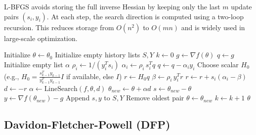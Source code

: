   \begin{algo}
    L-BFGS avoids storing the full inverse Hessian by keeping only the last $m$ update pairs $(s_i, y_i)$. 
    At each step, the search direction is computed using a two-loop recursion. 
    This reduces storage from $O(n^2)$ to $O(mn)$ and is widely used in large-scale optimization.
    \begin{algorithm}[H]
    \label{alg:lbfgs}
    \begin{algorithmic}[1]

        \State Initialize $\theta \gets \theta_0$
        \State Initialize empty history lists $S, Y$
        \State $k \gets 0$
          \State $g \gets \nabla f(\theta)$
          \State $q \gets g$
          \State Initialize empty list $\alpha$
            \State $\rho_i \gets 1 / (y_i^T s_i)$
            \State $\alpha_i \gets \rho_i \, s_i^T q$
            \State $q \gets q - \alpha_i y_i$
          \EndFor
          \State Choose scalar $H_0$ (e.g., $H_0 = \frac{s_{k-1}^T y_{k-1}}{y_{k-1}^T y_{k-1}} I$ if available, else $I$)
          \State $r \gets H_0 q$
            \State $\beta \gets \rho_i \, y_i^T r$
            \State $r \gets r + s_i (\alpha_i - \beta)$
          \EndFor
          \State $d \gets -r$ 
          \State $\alpha \gets \text{LineSearch}(f, \theta, d)$
          \State $\theta_{new} \gets \theta + \alpha d$
          \State $s \gets \theta_{new} - \theta$
          \State $y \gets \nabla f(\theta_{new}) - g$
           
            \State Append $s, y$ to $S, Y$
              \State Remove oldest pair
            \EndIf
          \EndIf
          \State $\theta \gets \theta_{new}$
          \State $k \gets k + 1$
        \EndWhile
        \State \Return $\theta$
      \EndProcedure
    \end{algorithmic}
    \end{algorithm}
  \end{algo}

\subsection{Davidon-Fletcher-Powell (DFP)}

